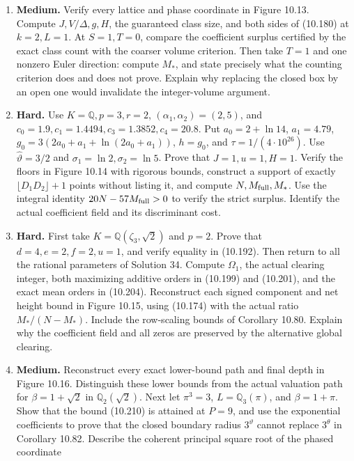 \documentclass[
  11pt,
  a4paper,
]{article}
\begin{document}
\begin{enumerate}
  need checking.
\item
  \textbf{Medium.} Verify every lattice and phase coordinate in Figure
  10.13. Compute \(J,V/\Delta,g,H\), the guaranteed class size, and both
  sides of (10.180) at \(k=2,L=1\). At \(S=1,T=0\), compare the
  coefficient surplus certified by the exact class count with the
  coarser volume criterion. Then take \(T=1\) and one nonzero Euler
  direction: compute \(M_*\), and state precisely what the counting
  criterion does and does not prove. Explain why replacing the closed
  box by an open one would invalidate the integer-volume argument.
\item
  \textbf{Hard.} Use \(K=\mathbb Q,p=3,r=2\),
  \((\alpha_1,\alpha_2)=(2,5)\), and
  \(c_0=1.9,c_1=1.4494,c_3=1.3852,c_4=20.8\). Put \(a_0=2+\ln14\),
  \(a_1=4.79\), \(g_0=3(2a_0+a_1+\ln(2a_0+a_1))\), \(h=g_0\), and
  \(\tau=1/(4\cdot10^{26})\). Use \(\widehat\vartheta=3/2\) and
  \(\sigma_1=\ln2,\sigma_2=\ln5\). Prove that \(J=1,u=1,H=1\). Verify
  the floors in Figure 10.14 with rigorous bounds, construct a support
  of exactly \(\lfloor D_1D_2\rfloor+1\) points without listing it, and
  compute \(N,M_{\rm full},M_*\). Use the integral identity
  \(20N-57M_{\rm full}>0\) to verify the strict surplus. Identify the
  actual coefficient field and its discriminant cost.
\item
  \textbf{Hard.} First take \(K=\mathbb Q(\zeta_3,\sqrt2)\) and \(p=2\).
  Prove that \(d=4,e=2,f=2,u=1\), and verify equality in (10.192). Then
  return to all the rational parameters of Solution 34. Compute
  \(\Omega_1\), the actual clearing integer, both maximizing additive
  orders in (10.199) and (10.201), and the exact mean orders in
  (10.204). Reconstruct each signed component and net height bound in
  Figure 10.15, using (10.174) with the actual ratio \(M_* /(N-M_*)\).
  Include the row-scaling bounds of Corollary 10.80. Explain why the
  coefficient field and all zeros are preserved by the alternative
  global clearing.
\item
  \textbf{Medium.} Reconstruct every exact lower-bound path and final
  depth in Figure 10.16. Distinguish these lower bounds from the actual
  valuation path for \(\beta=1+\sqrt2\) in \(\mathbb Q_2(\sqrt2)\). Next
  let \(\pi^3=3\), \(L=\mathbb Q_3(\pi)\), and \(\beta=1+\pi\). Show
  that the bound (10.210) is attained at \(P=9\), and use the
  exponential coefficients to prove that the closed boundary radius
  \(3^{\vartheta}\) cannot replace \(3^\theta\) in Corollary 10.82.
  Describe the coherent principal square root of the phased coordinate

\end{enumerate}
\end{document}

